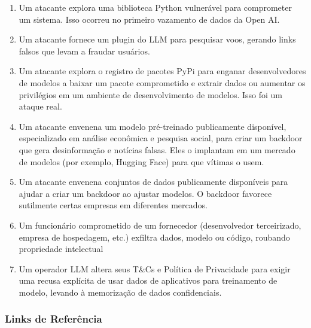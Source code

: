 \documentclass[
]{article}
\providecommand{\tightlist}{%
  \setlength{\itemsep}{0pt}\setlength{\parskip}{0pt}}
\begin{document}
\begin{enumerate}
\def\labelenumi{\arabic{enumi}.}
\tightlist
\item
  Um atacante explora uma biblioteca Python vulnerável para comprometer
  um sistema. Isso ocorreu no primeiro vazamento de dados da Open AI.
\item
  Um atacante fornece um plugin do LLM para pesquisar voos, gerando
  links falsos que levam a fraudar usuários.
\item
  Um atacante explora o registro de pacotes PyPi para enganar
  desenvolvedores de modelos a baixar um pacote comprometido e extrair
  dados ou aumentar os privilégios em um ambiente de desenvolvimento de
  modelos. Isso foi um ataque real.
\item
  Um atacante envenena um modelo pré-treinado publicamente disponível,
  especializado em análise econômica e pesquisa social, para criar um
  backdoor que gera desinformação e notícias falsas. Eles o implantam em
  um mercado de modelos (por exemplo, Hugging Face) para que vítimas o
  usem.
\item
  Um atacante envenena conjuntos de dados publicamente disponíveis para
  ajudar a criar um backdoor ao ajustar modelos. O backdoor favorece
  sutilmente certas empresas em diferentes mercados.
\item
  Um funcionário comprometido de um fornecedor (desenvolvedor
  terceirizado, empresa de hospedagem, etc.) exfiltra dados, modelo ou
  código, roubando propriedade intelectual
\item
  Um operador LLM altera seus T\&Cs e Política de Privacidade para
  exigir uma recusa explícita de usar dados de aplicativos para
  treinamento de modelo, levando à memorização de dados confidenciais.
\end{enumerate}

\subsubsection{Links de Referência}\label{links-de-referuxeancia}
\end{document}
